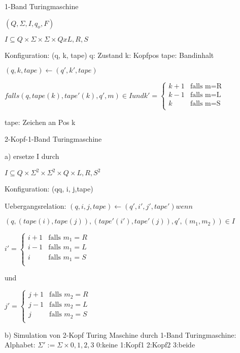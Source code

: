 \documentclass[12pt, oneside, a4paper, numbers=enddot, abstracton, parskip=full]{scrreprt}
\begin{document}
1-Band Turingmaschine

$(Q, \Sigma,I, q_o, F)$

$I \subseteq Q \times\Sigma\times\Sigma\times Q x{L,R,S}$

Konfiguration: (q, k, tape)
q: Zustand
k: Kopfpos
tape: Bandinhalt

$(q,k,tape) \leftarrow (q',k', tape)$

\begin{math}
falls (q, tape(k), tape'(k), q', m) \in I und k' =
  \begin{cases}
  k+1 & \text{falls m=R} \\
  k-1 & \text{falls m=L} \\
  k   & \text{falls m=S}\\
\end{cases}
\end{math}


tape: Zeichen an Pos k


2-Kopf-1-Band Turingmaschine


a) ersetze I durch

$I \subseteq Q \times\Sigma ^2\times\Sigma ^2\times Q \times{L,R,S}^2$

Konfiguration: (qq, i, j,tape)

Uebergangsrelation:
$(q,i,j,tape) \leftarrow (q',i',j',tape') wenn$

$(q,(tape(i),tape(j)), (tape'(i'),tape'(j)),q',(m_1,m_2)) \in I $

\begin{math}
  i' =
  \begin{cases}
    i+1 & \text{falls } m_1 = R \\
    i-1 & \text{falls } m_1 = L \\
    i   & \text{falls } m_1 = S \\
  \end{cases}
\end{math}

und

\begin{math}
  j' =
  \begin{cases}
    j+1 & \text{falls } m_2 = R \\
    j-1 & \text{falls } m_2 = L \\
    j   & \text{falls } m_2 = S \\
  \end{cases}
\end{math}


b) Simulation von 2-Kopf Turing Maschine durch 1-Band Turingmaschine:
Alphabet: $\Sigma' := \Sigma \times {0,1,2,3} $
0:keine
1:Kopf1
2:Kopf2
3:beide
\end{document}
